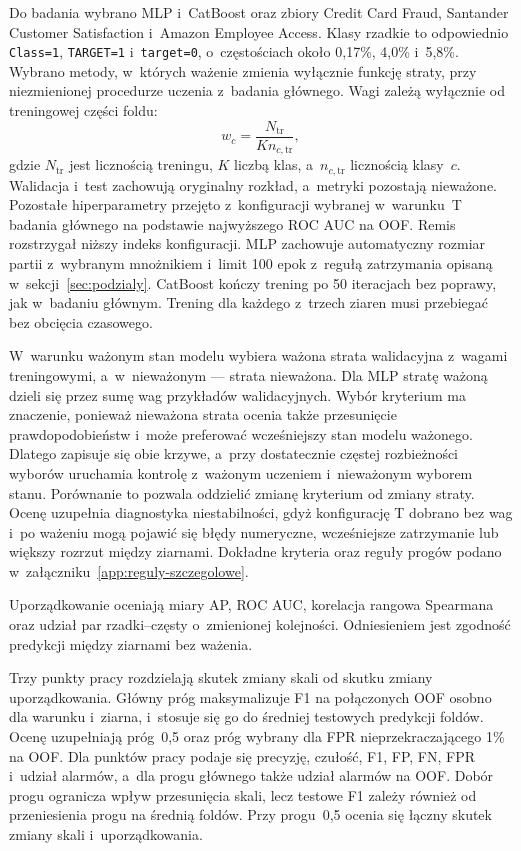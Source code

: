 Do badania wybrano MLP i~CatBoost oraz zbiory Credit Card Fraud, Santander Customer Satisfaction i~Amazon Employee Access. Klasy rzadkie to odpowiednio \texttt{Class=1}, \texttt{TARGET=1} i~\texttt{target=0}, o~częstościach około 0,17\%, 4,0\% i~5,8\%. Wybrano metody, w~których ważenie zmienia wyłącznie funkcję straty, przy niezmienionej procedurze uczenia z~badania głównego. Wagi zależą wyłącznie od treningowej części foldu:
\begin{equation}
w_c=\frac{N_{\mathrm{tr}}}{K n_{c,\mathrm{tr}}},
\label{eq:wagi-klas}
\end{equation}
gdzie $N_{\mathrm{tr}}$ jest licznością treningu, $K$ liczbą klas, a~$n_{c,\mathrm{tr}}$ licznością klasy~$c$. Walidacja i~test zachowują oryginalny rozkład, a~metryki pozostają nieważone. Pozostałe hiperparametry przejęto z~konfiguracji wybranej w~warunku~T badania głównego na podstawie najwyższego ROC AUC na OOF. Remis rozstrzygał niższy indeks konfiguracji. MLP zachowuje automatyczny rozmiar partii z~wybranym mnożnikiem i~limit 100 epok z~regułą zatrzymania opisaną w~sekcji~\ref{sec:podzialy}. CatBoost kończy trening po 50 iteracjach bez poprawy, jak w~badaniu głównym. Trening dla każdego z~trzech ziaren musi przebiegać bez obcięcia czasowego.

W~warunku ważonym stan modelu wybiera ważona strata walidacyjna z~wagami treningowymi, a~w~nieważonym --- strata nieważona. Dla MLP stratę ważoną dzieli się przez sumę wag przykładów walidacyjnych. Wybór kryterium ma znaczenie, ponieważ nieważona strata ocenia także przesunięcie prawdopodobieństw i~może preferować wcześniejszy stan modelu ważonego. Dlatego zapisuje się obie krzywe, a~przy dostatecznie częstej rozbieżności wyborów uruchamia kontrolę z~ważonym uczeniem i~nieważonym wyborem stanu. Porównanie to pozwala oddzielić zmianę kryterium od zmiany straty. Ocenę uzupełnia diagnostyka niestabilności, gdyż konfigurację T dobrano bez wag i~po ważeniu mogą pojawić się błędy numeryczne, wcześniejsze zatrzymanie lub większy rozrzut między ziarnami. Dokładne kryteria oraz reguły progów podano w~załączniku~\ref{app:reguly-szczegolowe}.

Uporządkowanie oceniają miary AP, ROC AUC, korelacja rangowa Spearmana oraz udział par rzadki--częsty o~zmienionej kolejności. Odniesieniem jest zgodność predykcji między ziarnami bez ważenia.

Trzy punkty pracy rozdzielają skutek zmiany skali od skutku zmiany uporządkowania. Główny próg maksymalizuje F1 na połączonych OOF osobno dla warunku i~ziarna, i~stosuje się go do średniej testowych predykcji foldów. Ocenę uzupełniają próg~0,5 oraz próg wybrany dla FPR nieprzekraczającego 1\% na OOF. Dla punktów pracy podaje się precyzję, czułość, F1, FP, FN, FPR i~udział alarmów, a~dla progu głównego także udział alarmów na OOF. Dobór progu ogranicza wpływ przesunięcia skali, lecz testowe F1 zależy również od przeniesienia progu na średnią foldów. Przy progu~0,5 ocenia się łączny skutek zmiany skali i~uporządkowania.

